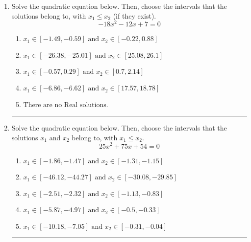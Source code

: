 \documentclass[14pt]{extbook}
\newcommand{\litem}[1]{\item#1\hspace*{-1cm}\rule{\textwidth}{0.4pt}}
\begin{document}
\begin{enumerate}
{\begin{enumerate}[label=\Alph*.]
\end{enumerate} }
\litem{
Solve the quadratic equation below. Then, choose the intervals that the solutions belong to, with $x_1 \leq x_2$ (if they exist).\[ -18x^{2} -12 x + 7 = 0 \]\begin{enumerate}[label=\Alph*.]
\item \( x_1 \in [-1.49, -0.59] \text{ and } x_2 \in [-0.22, 0.88] \)
\item \( x_1 \in [-26.38, -25.01] \text{ and } x_2 \in [25.08, 26.1] \)
\item \( x_1 \in [-0.57, 0.29] \text{ and } x_2 \in [0.7, 2.14] \)
\item \( x_1 \in [-6.86, -6.62] \text{ and } x_2 \in [17.57, 18.78] \)
\item \( \text{There are no Real solutions.} \)

\end{enumerate} }
\litem{
Solve the quadratic equation below. Then, choose the intervals that the solutions $x_1$ and $x_2$ belong to, with $x_1 \leq x_2$.\[ 25x^{2} +75 x + 54 = 0 \]\begin{enumerate}[label=\Alph*.]
\item \( x_1 \in [-1.86, -1.47] \text{ and } x_2 \in [-1.31, -1.15] \)
\item \( x_1 \in [-46.12, -44.27] \text{ and } x_2 \in [-30.08, -29.85] \)
\item \( x_1 \in [-2.51, -2.32] \text{ and } x_2 \in [-1.13, -0.83] \)
\item \( x_1 \in [-5.87, -4.97] \text{ and } x_2 \in [-0.5, -0.33] \)
\item \( x_1 \in [-10.18, -7.05] \text{ and } x_2 \in [-0.31, -0.04] \)


\end{enumerate}}
\end{enumerate}
\end{document}
